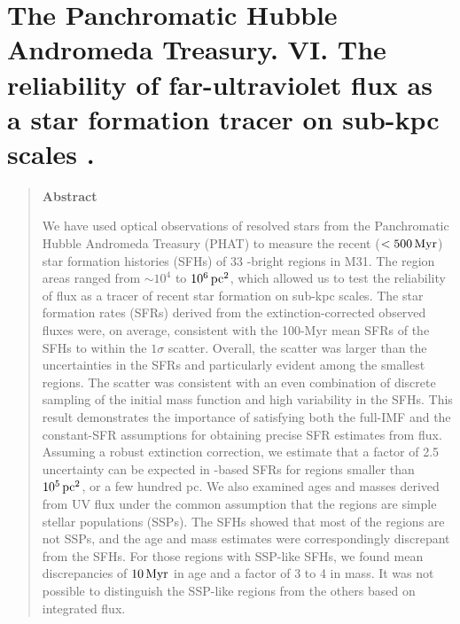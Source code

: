 \chapter{The Panchromatic Hubble Andromeda Treasury. \textsc{VI}. The
    reliability of far-ultraviolet flux as a star formation tracer on sub-kpc
    scales \citep{Simones:2014}.
}
\label{uv_regions}





\begin{quote}
\begin{center}
\textbf{\large Abstract}
\end{center}

We have used optical observations of resolved stars from the Panchromatic
Hubble Andromeda Treasury (PHAT) to measure the recent ($< 500\,\mathrm{Myr}$) star
formation histories (SFHs) of 33 \fuv{}-bright regions in M31. The region areas
ranged from $\sim 10^4$ to $10^6\,\mathrm{pc}^2$, which allowed us to test the
reliability of \fuv{} flux as a tracer of recent star formation on sub-kpc
scales. The star formation rates (SFRs) derived from the extinction-corrected
observed \fuv{} fluxes were, on average, consistent with the 100-Myr mean SFRs
of the SFHs to within the $1\sigma$ scatter. Overall, the scatter was larger
than the uncertainties in the SFRs and particularly evident among the smallest
regions. The scatter was consistent with an even combination of discrete
sampling of the initial mass function and high variability in the SFHs. This
result demonstrates the importance of satisfying both the full-IMF and the
constant-SFR assumptions for obtaining precise SFR estimates from \fuv{} flux.
Assuming a robust \fuv{} extinction correction, we estimate that a factor of
2.5 uncertainty can be expected in \fuv{}-based SFRs for regions smaller than
$10^5\,\mathrm{pc}^2$, or a few hundred pc. We also examined ages and masses derived from
UV flux under the common assumption that the regions are simple stellar
populations (SSPs). The SFHs showed that most of the regions are not SSPs, and
the age and mass estimates were correspondingly discrepant from the SFHs. For
those regions with SSP-like SFHs, we found mean discrepancies of $10\,\mathrm{Myr}$ in
age and a factor of 3 to 4 in mass. It was not possible to distinguish the
SSP-like regions from the others based on integrated \fuv{} flux.

\end{quote}





